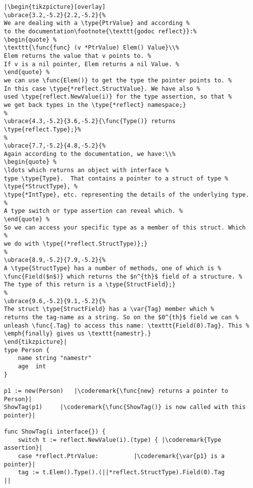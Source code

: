 \begin{lstlisting}[caption=Introspection using reflection,label=src:introspection]
|\begin{tikzpicture}[overlay]
\ubrace{3.2,-5.2}{2.2,-5.2}{%
We are dealing with a \type{PtrValue} and according %
to the documentation\footnote{\texttt{godoc reflect}}:%
\begin{quote} %
\texttt{\func{func} (v *PtrValue) Elem() Value}\\%
Elem returns the value that v points to. %
If v is a nil pointer, Elem returns a nil Value. %
\end{quote} %
we can use \func{Elem()} to get the type the pointer points to. %
In this case \type{*reflect.StructValue}. We have also %
used \type{reflect.NewValue(i)} for the type assertion, so that %
we get back types in the \type{*reflect} namespace;}
%
\ubrace{4.3,-5.2}{3.6,-5.2}{\func{Type()} returns \type{reflect.Type};}%
%
\ubrace{7.7,-5.2}{4.8,-5.2}{%
Again according to the documentation, we have:\\%
\begin{quote} %
\ldots which returns an object with interface %
type \type{Type}.  That contains a pointer to a struct of type %
\type{*StructType}, %
\type{*IntType}, etc. representing the details of the underlying type. %
A type switch or type assertion can reveal which. %
\end{quote} %
So we can access your specific type as a member of this struct. Which %
we do with \type{(*reflect.StructType)};}
%
\ubrace{8.9,-5.2}{7.9,-5.2}{%
A \type{StructType} has a number of methods, one of which is %
\func{Field($n$)} which returns the $n^{th}$ field of a structure. %
The type of this return is a \type{StructField};}
%
\ubrace{9.6,-5.2}{9.1,-5.2}{%
The struct \type{StructField} has a \var{Tag} member which %
returns the tag-name as a string. So on the $0^{th}$ field we can %
unleash \func{.Tag} to access this name: \texttt{Field(0).Tag}. This %
\emph{finally} gives us \texttt{namestr}.}
\end{tikzpicture}|
type Person {
    name string "namestr"
    age  int
}

p1 := new(Person)   |\coderemark{\func{new} returns a pointer to Person}|
ShowTag(p1)	    |\coderemark{\func{ShowTag()} is now called with this pointer}|

func ShowTag(i interface{}) {
    switch t := reflect.NewValue(i).(type) { |\coderemark{Type assertion}|
    case *reflect.PtrValue:		     |\coderemark{\var{p1} is a pointer}|
	tag := t.Elem().Type().(||*reflect.StructType).Field(0).Tag
||
\end{lstlisting}
